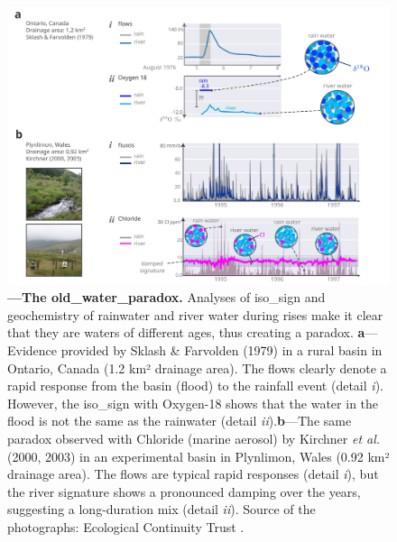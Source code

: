 \documentclass[./main_en.tex]{subfiles}
\begin{document}
\begin{figure}[t!] 
\centering				
\includegraphics[width=0.98\linewidth]{figs/fig_paradox2_en.jpg}		
\caption[The old water paradox]
{\textbf{---\;The \gls{old_water_paradox}.}
    Analyses of \gls{iso_sign} and geochemistry of rainwater and river water during rises make it clear that they are waters of different ages, thus creating a paradox. \;\textbf{a}\;---\;Evidence provided by Sklash \& Farvolden (1979) \cite{sklash1979} in a rural basin in Ontario, Canada (1.2 km² drainage area). The flows clearly denote a rapid response from the basin (flood) to the rainfall event (detail \textrm{\textit{i}}). However, the \gls{iso_sign} with Oxygen-18 shows that the water in the flood is not the same as the rainwater (detail \textrm{\textit{ii}}).\;\textbf{b}\;---\;The same paradox observed with Chloride (marine aerosol) by Kirchner \textit{et al.} (2000, 2003) \cite{kirchner2000, Kirchner2003} in an experimental basin in Plynlimon, Wales (0.92 km² drainage area). The flows are typical rapid responses (detail \textrm{\textit{i}}), but the river signature shows a pronounced damping over the years, suggesting a long-duration mix (detail \textrm{\textit{ii}}). Source of the photographs: Ecological Continuity Trust \cite{ect_plynlimon}.
}
\label{fig:hydro:paradox2} 		
\end{figure}
\end{document}
